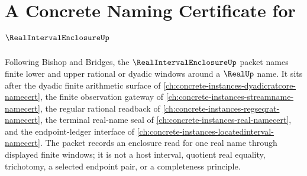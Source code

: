 \chapter{A Concrete Naming Certificate for $\RealIntervalEnclosureUp$}
\label{ch:concrete-instances-real-interval-enclosure-namecert}

Following Bishop and Bridges, the $\RealIntervalEnclosureUp$ packet names finite lower and upper rational or dyadic windows around a $\RealUp$ name. It sits after the dyadic finite arithmetic surface of \autoref{ch:concrete-instances-dyadicratcore-namecert}, the finite observation gateway of \autoref{ch:concrete-instances-streamname-namecert}, the regular rational readback of \autoref{ch:concrete-instances-regseqrat-namecert}, the terminal real-name seal of \autoref{ch:concrete-instances-real-namecert}, and the endpoint-ledger interface of \autoref{ch:concrete-instances-locatedinterval-namecert}. The packet records an enclosure read for one real name through displayed finite windows; it is not a host interval, quotient real equality, trichotomy, a selected endpoint pair, or a completeness principle.

